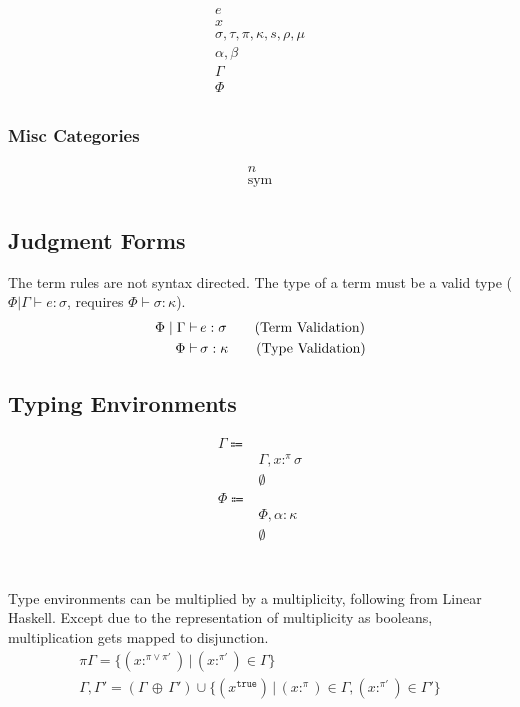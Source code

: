 \documentclass {article}
\begin{document}
\begin{align*}
e \tag{Terms} \\
x \tag{Variables} \\
\sigma, \tau, \pi, \kappa, s, \rho, \mu \tag{Types} \\
\alpha, \beta \tag{Type Variables} \\
\Gamma \tag{Type Environment} \\
\Phi \tag{Misc Environment} \\
\end{align*}

\subsubsection{Misc Categories}
\begin{align*}
n \tag{Numbers} \\
\text{sym} \tag{Symbol} \\
\end{align*}

\subsection{Judgment Forms}
The term rules are not syntax directed.
The type of a term must be a valid type ($ \Phi | \Gamma \vdash e : \sigma $, requires $ \Phi \vdash \sigma : \kappa $).
\begin{align*}
\Phi \mid \Gamma \vdash \, & e : \sigma \tag{\text{Term Validation}} \\
\Phi \vdash \, & \sigma : \kappa \tag{\text{Type Validation}} \\
\end{align*}

\subsection{Typing Environments}
\begin{align*}
\Gamma \Coloneqq & \\
& \Gamma, x :^\pi \sigma \\
& \emptyset \\
\Phi \Coloneqq & \\
& \Phi, \alpha : \kappa \\
& \emptyset \\
\end{align*} \\
\\
Type environments can be multiplied by a multiplicity, following from Linear Haskell.
Except due to the representation of multiplicity as booleans, multiplication gets mapped to disjunction.
\begin{gather*}
\pi \Gamma = \{(x :^{\pi \lor  \pi'}) \, | \, (x :^{\pi'}) \in \Gamma \} \\
\Gamma, \Gamma' = (\Gamma \, \oplus \, \Gamma') \cup \{ (x^\texttt{true}) \, | \, (x :^\pi) \in \Gamma, (x :^{\pi'}) \in \Gamma' \}
\end{gather*}
\end{document}
